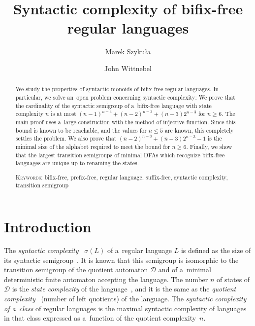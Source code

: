 \documentclass{amsart}
\renewcommand{\le}{\leqslant}
\renewcommand{\ge}{\geqslant}
\newcommand{\sig}{\sigma}
\newcommand{\noin}{\noindent}
\newcommand{\cD}{{\mathcal D}}
\begin{document}
\title{Syntactic complexity of bifix-free regular languages}
\author{Marek Szyku{\l}a}
\address{Institute of Computer Science, University of Wroc{\l}aw,\\
Joliot-Curie 15, PL-50-383 Wroc{\l}aw, Poland}
\author{John Wittnebel}
\address{David R. Cheriton School of Computer Science, University of Waterloo,\\
Waterloo, ON, Canada N2L 3G1}

\begin{abstract}
We study the properties of syntactic monoids of bifix-free regular languages.
In particular, we solve an~open problem concerning syntactic complexity:
We prove that the cardinality of the syntactic semigroup of a~bifix-free language with state complexity $n$ is at most $(n-1)^{n-3}+(n-2)^{n-3}+(n-3)2^{n-3}$ for $n\ge 6$.
The main proof uses a~large construction with the method of injective function.
Since this bound is known to be reachable, and the values for $n \le 5$ are known, this completely settles the problem.
We also prove that $(n-2)^{n-3} + (n-3)2^{n-3} - 1$ is the minimal size of the alphabet required to meet the bound for $n \ge 6$.
Finally, we show that the largest transition semigroups of minimal DFAs which recognize bifix-free languages are unique up to renaming the states.

\medskip\noin
{\textsc{Keywords:}} bifix-free, prefix-free, regular language, suffix-free, syntactic complexity, transition semigroup
\end{abstract}

\maketitle
\section{Introduction}

The \emph{syntactic complexity}~\cite{BrYe11} $\sig(L)$ of a~regular language $L$ is defined as the size of its syntactic semigroup~\cite{Pin97}.
It is known that this semigroup is isomorphic to the transition semigroup of the quotient automaton $\cD$ and of a~minimal deterministic finite automaton accepting the language.
The number $n$ of states of $\cD$ is the \emph{state complexity} of the language~\cite{Yu01}, and it is the same as the \emph{quotient complexity}~\cite{Brz10} (number of left quotients) of the language.
The \emph{syntactic complexity of a~class} of regular languages is the maximal syntactic complexity of languages in that class expressed as a~function of the quotient complexity~$n$.
\end{document}
